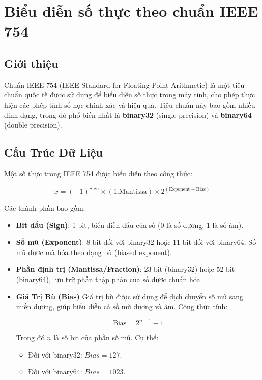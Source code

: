 \section{Biểu diễn số thực theo chuẩn IEEE 754}
\subsection{Giới thiệu}
Chuẩn IEEE 754 (IEEE Standard for Floating-Point Arithmetic) là một tiêu chuẩn quốc tế được sử dụng để biểu diễn số thực trong máy tính, cho phép thực hiện các phép tính số học chính xác và hiệu quả. Tiêu chuẩn này bao gồm nhiều định dạng, trong đó phổ biến nhất là \textbf{binary32} (single precision) và \textbf{binary64} (double precision).

\subsection{Cấu Trúc Dữ Liệu}
Một số thực trong IEEE 754 được biểu diễn theo công thức:

\[
x = (-1)^{\text{Sign}} \times (1.\text{Mantissa}) \times 2^{(\text{Exponent} - \text{Bias})}
\]

Các thành phần bao gồm:

\begin{itemize}
    \item \textbf{Bit dấu (Sign)}: 1 bit, biểu diễn dấu của số (0 là số dương, 1 là số âm).
    \item \textbf{Số mũ (Exponent)}: 8 bit đối với binary32 hoặc 11 bit đối với binary64. Số mũ được mã hóa theo dạng bù (biased exponent).
    \item \textbf{Phần định trị (Mantissa/Fraction)}: 23 bit (binary32) hoặc 52 bit (binary64), lưu trữ phần thập phân của số được chuẩn hóa.

    \item \textbf{Giá Trị Bù (Bias)}
Giá trị bù được sử dụng để dịch chuyển số mũ sang miền dương, giúp biểu diễn cả số mũ dương và âm. Công thức tính:

\[
\text{Bias} = 2^{n-1} - 1
\]

Trong đó \(n\) là số bit của phần số mũ. Cụ thể:

\begin{itemize}
    \item Đối với binary32: \(Bias = 127\).
    \item Đối với binary64: \(Bias = 1023\).
\end{itemize}
\end{itemize}

